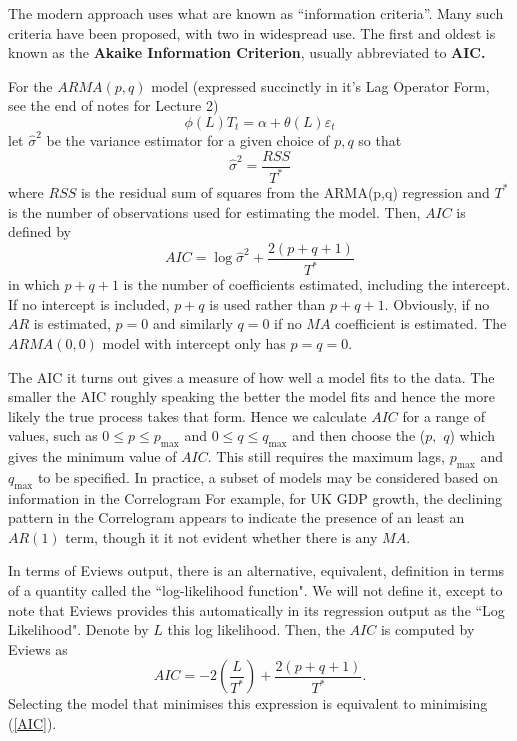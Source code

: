 \documentclass[openany]{tufte-book} %
\begin{document}
The modern approach uses what are known as \textquotedblleft information
criteria\textquotedblright . Many such criteria have been proposed, with two
in widespread use. The first and oldest is known as the \textbf{Akaike
	Information Criterion}, usually abbreviated to \textbf{AIC. }

For the $ARMA\left( p,q\right) $ model (expressed succinctly in it's Lag Operator Form, see the end of notes for Lecture 2)
\begin{equation*}
\phi \left( L\right) T_{t}=\alpha +\theta (L)\varepsilon _{t}
\end{equation*}%
let $\hat{\sigma}^{2}$ be the  variance estimator for a given choice of $p,q$ so that%
\begin{equation*}
\hat{\sigma}^{2}=\dfrac{RSS}{T^{\ast }}
\end{equation*}%
where $RSS$ is the residual sum of squares from the ARMA(p,q) regression and $T^{\ast }$ is the number of
observations used for estimating the model. Then, $AIC$ is defined by
\begin{equation}
AIC=\log \hat{\sigma}^{2}+\frac{2\left( p+q+1\right) }{T^{\ast }}
\label{AIC}
\end{equation}%
in which $p+q+1$ is the number of coefficients estimated, including the
intercept. If no intercept is included, $p+q$ is used rather than $p+q+1$.
Obviously, if no $AR$ is estimated, $p=0$ and similarly $q=0$ if no $MA$
coefficient is estimated. The $ARMA(0,0)$ model with intercept only has $%
p=q=0$.

The AIC it turns out gives a measure of how well a model fits to the data. The smaller the AIC roughly speaking the better the model fits and hence the more likely the true process takes that form. Hence we calculate $AIC$ for a range of values, such as $0\leqslant
p\leqslant p_{\max }$ and $0\leqslant q\leqslant q_{\max }$ and then choose
the ($p,$ $q$) which gives the minimum value of $AIC.$ This still requires
the maximum lags, $p_{\max }$ and $q_{\max }$ to be specified.  In practice,
a subset of models may be considered based on information in the
Correlogram For example, for UK GDP growth, the declining pattern in the
Correlogram appears to indicate the presence of an least an $AR(1)$ term,
though it it not evident whether there is any $MA$.

In terms of Eviews output, there is an alternative, equivalent, definition
in terms of a quantity called the \textquotedblleft log-likelihood
function". We will not define it, except to note that Eviews provides this
automatically in its regression output as the \textquotedblleft Log
Likelihood". Denote by $L$ this log likelihood. Then, the $AIC$ is computed
by Eviews as%
\begin{equation*}
AIC=-2\left( \frac{L}{T^{\ast }}\right) +\frac{2(p+q+1)}{T^{\ast }}.
\end{equation*}%
Selecting the model that minimises this expression is equivalent to
minimising (\ref{AIC}).
\end{document}
